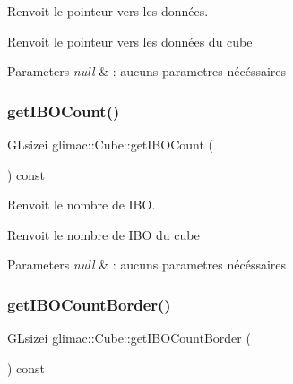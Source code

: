 Renvoit le pointeur vers les données. 

Renvoit le pointeur vers les données du cube


\begin{DoxyParams}{Parameters}
{\em null} & \+: aucuns parametres nécéssaires \\
\hline
\end{DoxyParams}
\mbox{\label{classglimac_1_1Cube_a15f4c706a6958d1e06479c0c1a743b8c}} 
\subsubsection{\texorpdfstring{get\+I\+B\+O\+Count()}{getIBOCount()}}
{\footnotesize\ttfamily G\+Lsizei glimac\+::\+Cube\+::get\+I\+B\+O\+Count (\begin{DoxyParamCaption}{ }\end{DoxyParamCaption}) const\hspace{0.3cm}{\ttfamily [inline]}}



Renvoit le nombre de I\+BO. 

Renvoit le nombre de I\+BO du cube


\begin{DoxyParams}{Parameters}
{\em null} & \+: aucuns parametres nécéssaires \\
\hline
\end{DoxyParams}
\mbox{\label{classglimac_1_1Cube_af5e5d77fd2bd354383d7b448234d5286}} 
\subsubsection{\texorpdfstring{get\+I\+B\+O\+Count\+Border()}{getIBOCountBorder()}}
{\footnotesize\ttfamily G\+Lsizei glimac\+::\+Cube\+::get\+I\+B\+O\+Count\+Border (\begin{DoxyParamCaption}{ }\end{DoxyParamCaption}) const\hspace{0.3cm}{\ttfamily [inline]}}



